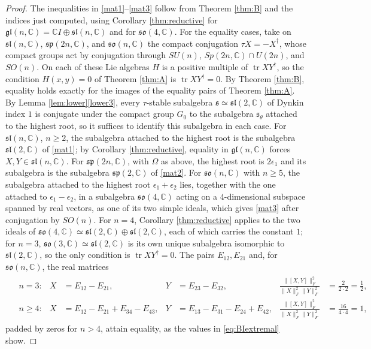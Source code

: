 \documentclass [leqno, 10pt]{amsart}
\theoremstyle{definition}
\numberwithin{equation}{section}
\newcommand{\so}{\mathfrak{so}}
\renewcommand{\sp}{\mathfrak{sp}}
\newcommand{\ep}{\epsilon}
\newcommand{\gl}{\mathfrak{gl}}
\newcommand{\sll}{\mathfrak{sl}}
\newcommand{\com}{\mathbb C}
\newcommand{\tr}{\operatorname{tr}}
\newcommand{\fnorm}[1]{\lVert #1\rVert_{F}}
\newcommand{\subs}{\mathfrak{s}}
\begin{document}
\begin{proof}
The inequalities in \ref{mat1}--\ref{mat3} follow from Theorem \ref{thm:B} and the indices just computed, using Corollary \ref{thm:reductive} for $\gl(n, \com) = \com I \oplus \sll(n, \com)$ and for $\so(4, \com)$. For the equality cases, take on $\sll(n, \com)$, $\sp(2n, \com)$, and $\so(n, \com)$ the compact conjugation $\tau X = -X^{\dagger}$, whose compact groups act by conjugation through $SU(n)$, $Sp(2n, \com) \cap U(2n)$, and $SO(n)$. On each of these Lie algebras $H$ is a positive multiple of $\tr XY^{\dagger}$, so the condition $H(x, y) = 0$ of Theorem \ref{thm:A} is $\tr XY^{\dagger} = 0$. By Theorem \ref{thm:B}, equality holds exactly for the images of the equality pairs of Theorem \ref{thm:A}. By Lemma \ref{lem:lower}\ref{lower3}, every $\tau$-stable subalgebra $\subs \simeq \sll(2, \com)$ of Dynkin index $1$ is conjugate under the compact group $G_{0}$ to the subalgebra $\subs_{\theta}$ attached to the highest root, so it suffices to identify this subalgebra in each case. For $\sll(n, \com)$, $n \geq 2$, the subalgebra attached to the highest root is the subalgebra $\sll(2, \com)$ of \ref{mat1}; by Corollary \ref{thm:reductive}, equality in $\gl(n, \com)$ forces $X, Y \in \sll(n, \com)$. For $\sp(2n, \com)$, with $\Omega$ as above, the highest root is $2\ep_{1}$ and its subalgebra is the subalgebra $\sp(2, \com)$ of \ref{mat2}. For $\so(n, \com)$ with $n \geq 5$, the subalgebra attached to the highest root $\ep_{1} + \ep_{2}$ lies, together with the one attached to $\ep_{1} - \ep_{2}$, in a subalgebra $\so(4, \com)$ acting on a $4$-dimensional subspace spanned by real vectors, as one of its two simple ideals, which gives \ref{mat3} after conjugation by $SO(n)$. For $n = 4$, Corollary \ref{thm:reductive} applies to the two ideals of $\so(4, \com) \simeq \sll(2, \com) \oplus \sll(2, \com)$, each of which carries the constant $1$; for $n = 3$, $\so(3, \com) \simeq \sll(2, \com)$ is its own unique subalgebra isomorphic to $\sll(2, \com)$, so the only condition is $\tr XY^{\dagger} = 0$. The pairs $E_{12}, E_{21}$ and, for $\so(n, \com)$, the real matrices
\begin{align}\label{eq:BIextremal}
\begin{aligned}
&n = 3: & X &= E_{12} - E_{21}, & Y &= E_{23} - E_{32}, & \frac{\fnorm{[X, Y]}^{2}}{\fnorm{X}^{2}\fnorm{Y}^{2}} &= \frac{2}{2\cdot 2} = \frac{1}{2},\\
&n \geq 4: & X &= E_{12} - E_{21} + E_{34} - E_{43}, & Y &= E_{13} - E_{31} - E_{24} + E_{42}, & \frac{\fnorm{[X, Y]}^{2}}{\fnorm{X}^{2}\fnorm{Y}^{2}} &= \frac{16}{4\cdot 4} = 1,
\end{aligned}
\end{align}
padded by zeros for $n > 4$, attain equality, as the values in \eqref{eq:BIextremal} show.


\end{proof}
\end{document}
